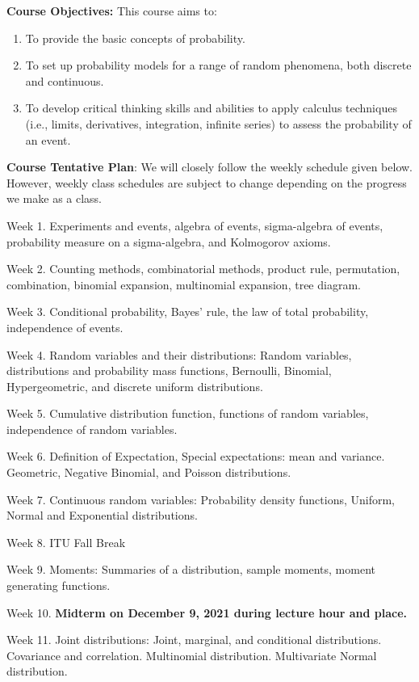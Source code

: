 \documentclass[
  12pt,
]{article}
\providecommand{\tightlist}{%
  \setlength{\itemsep}{0pt}\setlength{\parskip}{0pt}}
\begin{document}
\textbf{Course Objectives:} This course aims to:

\begin{enumerate}
\def\labelenumi{\arabic{enumi}.}
\tightlist
\item
  To provide the basic concepts of probability.
\item
  To set up probability models for a range of random phenomena, both
  discrete and continuous.
\item
  To develop critical thinking skills and abilities to apply calculus
  techniques (i.e., limits, derivatives, integration, infinite series)
  to assess the probability of an event.
\end{enumerate}

\textbf{Course Tentative Plan}: We will closely follow the weekly
schedule given below. However, weekly class schedules are subject to
change depending on the progress we make as a class.

Week 1. Experiments and events, algebra of events, sigma-algebra of
events, probability measure on a sigma-algebra, and Kolmogorov axioms.

Week 2. Counting methods, combinatorial methods, product rule,
permutation, combination, binomial expansion, multinomial expansion,
tree diagram.

Week 3. Conditional probability, Bayes' rule, the law of total
probability, independence of events.

Week 4. Random variables and their distributions: Random variables,
distributions and probability mass functions, Bernoulli, Binomial,
Hypergeometric, and discrete uniform distributions.

Week 5. Cumulative distribution function, functions of random variables,
independence of random variables.

Week 6. Definition of Expectation, Special expectations: mean and
variance. Geometric, Negative Binomial, and Poisson distributions.

Week 7. Continuous random variables: Probability density functions,
Uniform, Normal and Exponential distributions.

Week 8. ITU Fall Break

Week 9. Moments: Summaries of a distribution, sample moments, moment
generating functions.

Week 10. \textbf{Midterm on December 9, 2021 during lecture hour and
place.}

Week 11. Joint distributions: Joint, marginal, and conditional
distributions. Covariance and correlation. Multinomial distribution.
Multivariate Normal distribution.
\end{document}
